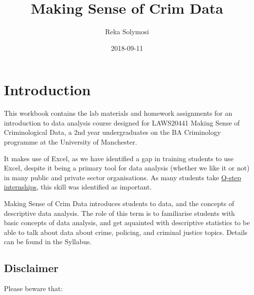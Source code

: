 \documentclass[]{book}
\title{Making Sense of Crim Data}
\author{Reka Solymosi}
\date{2018-09-11}
\theoremstyle{definition}
\theoremstyle{definition}
\theoremstyle{definition}
\theoremstyle{remark}
\begin{document}
\maketitle

{
\setcounter{tocdepth}{1}
\tableofcontents
}
\hypertarget{introduction}{%
\chapter*{Introduction}\label{introduction}}

This workbook contains the lab materials and homework assignments for an
introduction to data analysis course designed for LAWS20441 Making Sense
of Criminological Data, a 2nd year undergraduates on the BA Criminology
programme at the University of Manchester.

It makes use of Excel, as we have identified a gap in training students
to use Excel, despite it being a primary tool for data analysis (whether
we like it or not) in many public and private sector organisations. As
many students take
\href{https://www.humanities.manchester.ac.uk/q-step/}{Q-step
internships}, this skill was identified as important.

Making Sense of Crim Data introduces students to data, and the concepts
of descriptive data analysis. The role of this term is to familiarise
students with basic concepts of data analysis, and get aquainted with
descriptive statistics to be able to talk about data about crime,
policing, and criminal justice topics. Details can be found in the
Syllabus.

\hypertarget{disclaimer}{%
\section{Disclaimer}\label{disclaimer}}

Please beware that:
\end{document}
